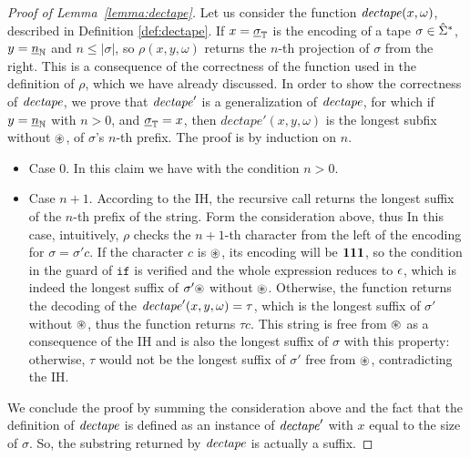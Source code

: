 \begin{proof}[Proof of Lemma~\ref{lemma:dectape}]
Let us consider the function $\mathit{dectape}(x,\omega)$, described
in Definition \ref{def:dectape}.
If $x= \underline{\sigma}_{\mathbb{T}}$ is the encoding of a tape $\sigma \in \hat{\Sigma}^*$,
$y=\underline{n}_{\mathbb{N}}$ and $n \leq |\sigma|$,
so $\rho(x,y,\omega)$ returns the $n$-th projection
of $\sigma$ from the right.
%
This is a consequence of the correctness of the function
used in the definition of $\rho$,
which we have already discussed.
%
In order to show the correctness of $\mathit{dectape}$,
we prove that $\mathit{dectape}'$
is a generalization of $\mathit{dectape}$,
for which if $y=\underline{n}_{\mathbb{N}}$ with $n>0$,
and  $\underline{\sigma}_{\mathbb{T}} = x$, then
$dectape'(x,y,\omega)$ is the longest subfix
without $\circledast$, of $\sigma$'s $n$-th prefix.
%
The proof is by induction on $n$.
\begin{itemize}
  \item Case $0$. In this claim we have with the condition $n>0$.
  \item Case $n+1$. According to the IH, the recursive call returns the longest
  suffix of the $n$-th prefix of the string. Form the consideration above, thus
  In this case, intuitively, $\rho$ checks the $n+1$-th character from the left
  of the encoding for $\sigma=\sigma'c$.
  If the character $c$ is $\circledast$, its encoding will be $\mathbf{1}\mathbf{1}\mathbf{1}$,
  so the condition in the guard of $\mathtt{if}$ is verified
  and the whole expression reduces to $\epsilon$, which is indeed
  the longest suffix of $\sigma' \circledast$ without $\circledast$.
  Otherwise, the function returns the decoding of the
  $\mathit{\mathit{dectape}'}(x,y,\omega) = \tau$, which is the longest suffix of $\sigma'$
  without $\circledast$, thus the function returns $\tau c$.
  This string is free from $\circledast$ as a consequence of the IH and is also the longest
  suffix of $\sigma$ with this property: otherwise, $\tau$ would not be the
  longest suffix of $\sigma'$ free from $\circledast$, contradicting the IH.
\end{itemize}
\noindent
We conclude the proof by summing the consideration above
and the fact that the definition of $\mathit{dectape}$
is defined as an instance of $\mathit{dectape}'$
with $x$ equal to the size of $\sigma$.
So, the substring returned by $\mathit{dectape}$
is actually a suffix.
\end{proof}
